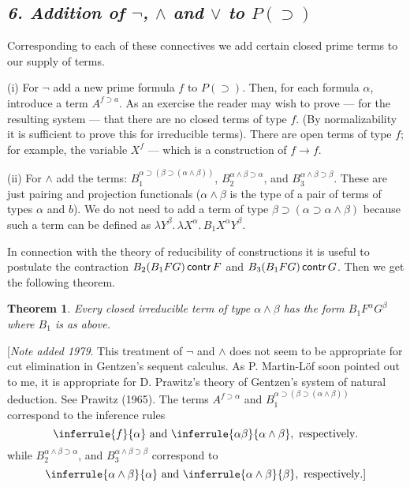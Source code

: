 \documentclass[12pt]{article}
\def\imp{\rightarrow}
\def\l{\lambda}
\def\limp{\supset}
\def\PI{P(\limp)}
\def\a{\alpha}
\def\b{\beta}
\newtheorem{theorem}{Theorem}
\begin{document}
\def\fimpa{f \limp a}
\def\contr{\mathop{\sf contr}}

\subsection{\it 6. Addition of \texorpdfstring{$\lnot$, $\land$ and $\lor$ to $\PI$}{¬, ∧, and ∨ to P(⊃)}}

Corresponding to each of these connectives we add certain closed prime terms to our supply of terms.

\medskip
\noindent
(i) For $\lnot$ add a new prime formula $f$ to $\PI$. Then, for each formula $\a$, introduce a term
$A^{\fimpa}$. As an exercise the reader may wish to prove --- for the resulting system ---
that there are no closed terms of type $f$. (By normalizability it is sufficient to prove this for irreducible terms). 
There are open terms of type $f$; for example, the variable $X^f$ — which is a construction of $f \imp f$.

\medskip
\noindent
(ii) For $\land$ add the terms: $B_1^{\a \limp (\b \limp (\a \land \b))}$, $B_2^{\a \land \b \limp \a}$, and $B_3^{\a \land \b \limp \b}$. These are just pairing and projection functionals ($\a \land \b$ is the type of a pair of
terms of types $\a$ and $b$). We do not need to add a term of type $\b \limp (\a \limp \a \land \b)$
because such a term can be defined as $\l Y^\b . \, \l X ^\a . \, B_1 X^\a Y^\b$.

In connection with the theory of reducibility of constructions it is useful to postulate the contraction
$B_2(B_1 FG) \contr F $ and $B_3(B_1 FG) \contr G$.
Then we get the following theorem.

\begin{theorem}
Every closed irreducible term of type $\a \land \b$ has the form $B_1 F^\a G^\b $ where $B_1$ is as above.
\end{theorem}
[{\it Note added 1979}. This treatment of $\lnot$ and $\land$ does not seem to be appropriate for cut elimination in Gentzen's sequent calculus. 
As P. Martin-Löf soon pointed out to me, it is appropriate for D. Prawitz's theory of Gentzen's system of natural deduction.
See Prawitz (1965). The terms $A^{f \limp \a}$ and $B_1^{\a \limp (\b \limp (\a \land \b))}$ correspond
to the inference rules
$$
\inferrule{f}{\a} \text{ and } \inferrule{\a \b}{\a \land \b}, \text{ respectively}.
$$
while $B_2^{\a \land \b \limp \a}$, and $B_3^{\a \land \b \limp \b}$ correspond to
$$
\inferrule{\a \land \b}{\a} \text{ and } \inferrule{\a \land \b}{\b}, \text{ respectively}. ]
$$
\end{document}
